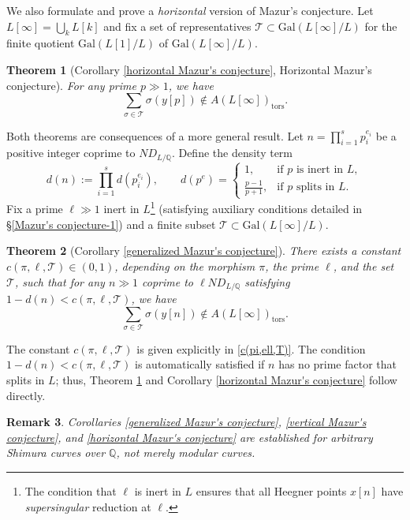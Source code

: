 \documentclass[11pt,oneside,reqno]{amsart}
\newcommand{\Gal}{\mathrm{Gal}}
\newcommand{\Q}{\mathbb{Q}}
\newcommand{\Tcal}{\mathcal{T}}
\theoremstyle{plain}
\newtheorem{theorem}{Theorem}[section]
\newtheorem{remark}[theorem]{Remark}
\begin{document}
	We also formulate and prove a \emph{horizontal} version of Mazur's conjecture. Let $L[\infty]=\bigcup_k L[k]$ and fix a set of representatives $\Tcal\subset \Gal(L[\infty]/L)$ for the finite quotient $\Gal(L[1]/L)$ of $\Gal(L[\infty]/L)$.
	
	\begin{theorem}[Corollary \ref{horizontal Mazur's conjecture}, Horizontal Mazur's conjecture]\label{Theorem 1.3}
		For any \emph{prime} $p\gg1$, we have
		\[
		\sum_{\sigma\in\Tcal}\sigma(y[p])\notin A(L[\infty])_\mathrm{tors}.
		\]
	\end{theorem}
	
	Both theorems are consequences of a more general result. Let $n=\prod_{i=1}^s p_i^{e_i}$ be a positive integer coprime to $ND_{L/\Q}$. Define the density term
	\[
	d(n):=\prod_{i=1}^s d(p_i^{e_i}),
	\qquad
	d(p^e)=
	\begin{cases}
		1, & \text{if $p$ is inert in $L$},\\
		\frac{p-1}{p+1}, & \text{if $p$ splits in $L$}.
	\end{cases}
	\]
	Fix a prime $\ell\gg 1$ inert in $L$\footnote{The condition that $\ell$ is inert in $L$ ensures that all Heegner points $x[n]$ have \emph{supersingular} reduction at $\ell$.} (satisfying auxiliary conditions detailed in §\ref{Mazur's conjecture-1}) and a finite subset $\Tcal\subset \Gal(L[\infty]/L)$.
	
	\begin{theorem}[Corollary \ref{generalized Mazur's conjecture}]
		There exists a constant $c(\pi,\ell,\Tcal)\in(0,1)$, depending on the morphism $\pi$, the prime $\ell$, and the set $\Tcal$, such that for any $n\gg1$ coprime to $\ell ND_{L/\Q}$ satisfying $1-d(n)<c(\pi,\ell,\Tcal)$, we have
		\[
		\sum_{\sigma\in\Tcal}\sigma(y[n])\notin A(L[\infty])_\mathrm{tors}.
		\]
	\end{theorem}
	The constant $c(\pi,\ell,\Tcal)$ is given explicitly in \eqref{c(pi,ell,T)}. The condition $1-d(n)<c(\pi,\ell,\Tcal)$ is automatically satisfied if $n$ has no prime factor that splits in $L$; thus, Theorem \ref{Theorem 1.3} and Corollary \ref{horizontal Mazur's conjecture} follow directly.
	\begin{remark}
		Corollaries \ref{generalized Mazur's conjecture}, \ref{vertical Mazur's conjecture}, and \ref{horizontal Mazur's conjecture} are established for arbitrary Shimura curves over $\Q$, not merely modular curves.
	\end{remark}
	
\end{document}
